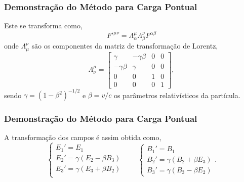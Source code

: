 \documentclass[xcolor=dvipsnames]{beamer}
\begin{document}
\begin{frame}
	\frametitle{Demonstração do Método para Carga Pontual}
	Este se transforma como, 
	\begin{equation}
		{F'}^{\mu \nu} = \Lambda _\alpha ^\mu \Lambda _\beta ^\nu F^{\alpha
		\beta}
	\end{equation}
	onde $\Lambda _\mu ^\nu$ são os componentes da matriz de transformação
	de Lorentz,
	\begin{equation}
		\Lambda ^\mu _\nu = \begin{bmatrix}
			\gamma & -\gamma \beta & 0 & 0 \\
			-\gamma \beta & \gamma & 0 & 0 \\
			0 & 0 & 1 & 0 \\
			0 & 0 & 0 & 1
		\end{bmatrix},
	\end{equation}
	sendo $\gamma = (1-\beta ^2)^{-1/2}$ e $\beta = v/c$ os parâmetros
	relativísticos da partícula.
\end{frame}

\begin{frame}
	\frametitle{Demonstração do Método para Carga Pontual}
	A transformação dos campos é assim obtida como,
	\begin{equation}
		\label{eq_field_trans}
		\begin{cases}
		E_1' = E_1 \\
		E_2' = \gamma (E_2 - \beta B_3) \\
		E_3' = \gamma (E_3 + \beta B_2) \\
		\end{cases} \qquad
		\begin{cases}
		B_1 ' = B_1 \\
		B_2 ' = \gamma (B_2 + \beta E_3) \\
		B_3' = \gamma(B_3 - \beta E_2)
		\end{cases}.
	\end{equation}
\end{frame}
\end{document}
